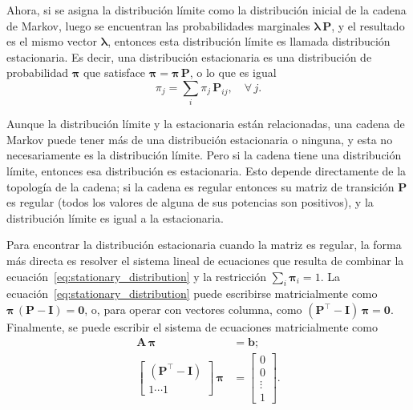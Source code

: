 Ahora, si se asigna la distribución límite como la distribución inicial de la cadena de Markov, luego se encuentran las
probabilidades marginales $\boldsymbol{\lambda}\,\mathbf{P}$, y el resultado es el mismo vector $\boldsymbol{\lambda}$, entonces
esta distribución límite es llamada distribución estacionaria.
Es decir, una distribución estacionaria es una distribución de probabilidad $\boldsymbol{\pi}$ que satisface
$\boldsymbol{\pi} = \boldsymbol{\pi}\,\mathbf{P}$, o lo que es igual
%
\begin{equation}
    \label{eq:stationary_distribution}
    \pi_j = \sum_i \pi_j\, \mathbf{P}_{ij}, \quad \forall\, j.
\end{equation}

Aunque la distribución límite y la estacionaria están relacionadas, una cadena de Markov puede tener más de una
distribución estacionaria o ninguna, y esta no necesariamente es la distribución límite.
Pero si la cadena tiene una distribución límite, entonces esa distribución es estacionaria.
Esto depende directamente de la topología de la cadena;
si la cadena es regular entonces su matriz de transición $\mathbf{P}$ es regular (todos los valores de alguna de sus
potencias son positivos), y la distribución límite es igual a la estacionaria.

Para encontrar la distribución estacionaria cuando la matriz es regular, la forma más directa es resolver el sistema
lineal de ecuaciones que resulta de combinar la ecuación~\eqref{eq:stationary_distribution} y la restricción
$\sum_i \boldsymbol{\pi}_i = 1$.
La ecuación~\eqref{eq:stationary_distribution} puede escribirse matricialmente como
$\boldsymbol{\pi}\,(\mathbf{P} - \mathbf{I}) = \mathbf{0}$, o, para operar con vectores columna, como
$\left(\mathbf{P}^\intercal - \mathbf{I}\right)\,\boldsymbol{\pi} = \mathbf{0}$.
Finalmente, se puede escribir el sistema de ecuaciones matricialmente como
%
\begin{align}
    \mathbf{A}\,\boldsymbol{\pi} &= \mathbf{b}; \\
    \left[\begin{matrix}
              \left(\mathbf{P}^\intercal - \mathbf{I}\right) \\ 1 \cdots 1
    \end{matrix}\right]\,\boldsymbol{\pi} &= \left[\begin{matrix}
                                                       0 \\ 0 \\ \vdots \\ 1
    \end{matrix}\right].
\end{align}

